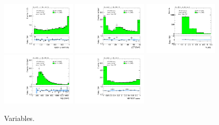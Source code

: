 \begin{figure}[tp]
  \includegraphics[width=0.32\textwidth]{figures/analysis/vbf-MCXSR/lep-eta-centrality}
  \includegraphics[width=0.32\textwidth]{figures/analysis/vbf-MCXSR/system-pt}
  \includegraphics[width=0.32\textwidth]{figures/analysis/vbf-MCXSR/n-jets30}
  \includegraphics[width=0.32\textwidth]{figures/analysis/vbf-MCXSR/dijet-m-high}
  \includegraphics[width=0.32\textwidth]{figures/analysis/vbf-MCXSR/BDTEve-VBF}
  \caption{Variables.}
  \label{fig:backgrounds-MCXSR-jets}
\end{figure}

